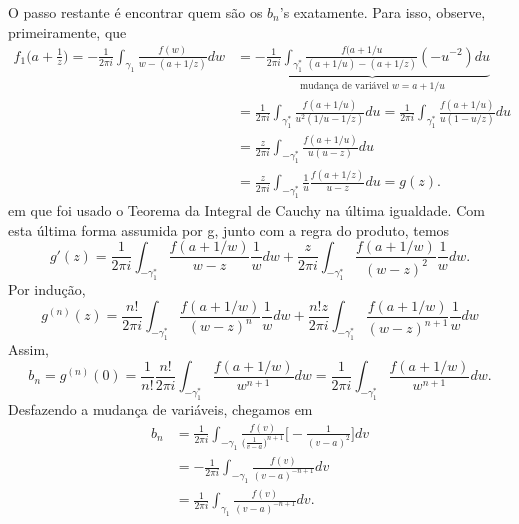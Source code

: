 \documentclass[ComplexAnalysis/complex.tex]{subfiles}
\begin{document}
\begin{proof*}
	O passo restante é encontrar quem são os \(b_{n}\)'s exatamente. Para isso, observe, primeiramente, que
	\begin{align*}
		f_{1}\biggl(a + \frac{1}{z}\biggr) = -\frac{1}{2\pi i}\int_{\gamma _{1}}^{}\frac{f(w)}{w-(a+1/z)}dw & = \underbrace{-\frac{1}{2\pi i}\int_{\gamma_{1}^{*}}^{}\frac{f(a+1/u}{(a+1/u)-(a+1/z)}(-u^{-2})du}_{\text{mudança de variável } w = a + 1/u}       \\
		                                                                                                    & = \frac{1}{2\pi i}\int_{\gamma_{1}^{*}}^{}\frac{f(a+1/u)}{u^{2}(1/u-1/z)}du = \frac{1}{2\pi i}\int_{\gamma _{1}^{*}}^{}\frac{f(a+1/u)}{u(1-u/z)}du \\
		                                                                                                    & = \frac{z}{2\pi i}\int_{-\gamma _{1}^{*}}^{}\frac{f(a+1/u)}{u(u-z)}du                                                                              \\
		                                                                                                    & = \frac{z}{2\pi i}\int_{-\gamma _{1}^{*}}^{}\frac{1}{u}\frac{f(a+1/z)}{u-z}du = g(z).
	\end{align*}
	em que foi usado o Teorema da Integral de Cauchy na última igualdade. Com esta última forma assumida por g, junto com a regra do produto, temos
	\[
		g'(z) = \frac{1}{2\pi i}\int_{-\gamma _{1}^{*}}^{}\frac{f(a+1/w)}{w-z}\frac{1}{w}dw + \frac{z}{2\pi i}\int_{-\gamma _{1}^{*}}^{}\frac{f(a+1/w)}{(w-z)^{2}}\frac{1}{w}dw.
	\]
	Por indução,
	\[
		g^{(n)}(z) = \frac{n!}{2\pi i}\int_{-\gamma _{1}^{*}}^{}\frac{f(a+1/w)}{(w-z)^{n}}\frac{1}{w}dw + \frac{n!z}{2\pi i}\int_{-\gamma _{1}^{*}}^{}\frac{f(a+1/w)}{(w-z)^{n+1}}\frac{1}{w}dw
	\]
	Assim,
	\[
		b_{n} = g^{(n)}(0) = \frac{1}{n!}\frac{n!}{2\pi i}\int_{-\gamma _{1}^{*}}^{}\frac{f(a+1/w)}{w^{n+1}}dw = \frac{1}{2\pi i}\int_{-\gamma _{1}^{*}}^{}\frac{f(a+1/w)}{w^{n+1}}dw.
	\]
	Desfazendo a mudança de variáveis, chegamos em
	\begin{align*}
		b_{n} & = \frac{1}{2\pi i}\int_{-\gamma _{1}}^{}\frac{f(v)}{\biggl(\frac{1}{v-a}\biggr)^{n+1}}\biggl[-\frac{1}{(v-a)^{2}}\biggr]dv \\
		      & = -\frac{1}{2\pi i}\int_{-\gamma _{1}}^{}\frac{f(v)}{(v-a)^{-n+1}}dv                                                       \\
		      & = \frac{1}{2\pi i}\int_{\gamma _{1}}^{}\frac{f(v)}{(v-a)^{-n+1}}dv.
	\end{align*}

\end{proof*}
\end{document}
